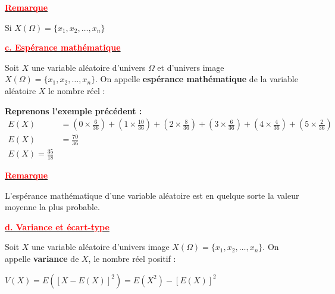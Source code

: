 \documentclass[12pt,a4paper]{article}
\newcounter{exemple}
\begin{document}
\vspace{2em}

\underline{\textbf{\textcolor{red}{Remarque}}}

Si $X(\Omega) = \{x_1, x_2, \dots, x_n\}$ \\

\begin{center}
\end{center}



\underline{\textbf{\textcolor{red}{c. Espérance mathématique}}}

Soit $X$ une variable aléatoire d'univers $\Omega$ et d'univers image $X(\Omega) = \{x_1, x_2, \dots, x_n\}$.
On appelle \textbf{espérance mathématique} de la variable aléatoire $X$ le nombre réel :
\begin{center}
\end{center}

\vspace{1em}

\textbf{Reprenons l'exemple précédent :}
\begin{align*}
E(X) &= \left( 0 \times \frac{6}{36} \right) + \left( 1 \times \frac{10}{36} \right) + \left( 2 \times \frac{8}{36} \right) + \left( 3 \times \frac{6}{36} \right) + \left( 4 \times \frac{4}{36} \right) + \left( 5 \times \frac{2}{36} \right) \\
E(X) &= \frac{70}{36} \\
\boxed{E(X) = \frac{35}{18}}
\end{align*}

\vspace{1em}
\underline{\textbf{\textcolor{red}{Remarque}}}

L'espérance mathématique d'une variable aléatoire est en quelque sorte la valeur moyenne la plus probable.

\vspace{2em}

\underline{\textbf{\textcolor{red}{d. Variance et écart-type}}}

Soit $X$ une variable aléatoire d'univers image $X(\Omega) = \{x_1, x_2, \dots, x_n\}$. On appelle \textbf{variance} de $X$, le nombre réel positif :
\begin{center}
    {\color{red} $V(X) = E\left( [X - E(X)]^2 \right) = E(X^2) - [E(X)]^2$}
\end{center}
\end{document}
